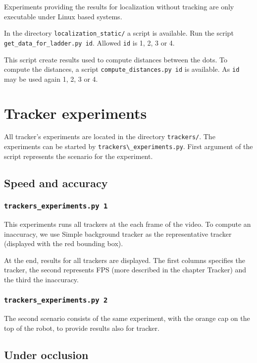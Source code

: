 Experiments providing the results for localization without tracking are only
executable under Linux based systems.

In the directory \verb+localization_static/+ a script is  available.
Run the script \verb+get_data_for_ladder.py id+. Allowed \verb+id+ is 1, 2, 3 or 4.

This script create results used to compute distances between the dots. To
compute the distances, a script \verb+compute_distances.py id+ is available. As
\verb+id+ may be used again 1, 2, 3 or 4. 

\section{Tracker experiments}

All tracker's experiments are located in the directory \verb+trackers/+. The
experiments can be started by \verb+trackers\_experiments.py+. First argument
of the script represents the scenario for the experiment.

\subsection*{Speed and accuracy}

\subsubsection*{\texttt{trackers{\_}experiments.py 1}}

This experiments runs all trackers at the each frame of the video. To compute
an inaccuracy, we use Simple background tracker as the representative tracker
(displayed with the red bounding box).

At the end, results for all trackers are displayed. The first columns specifies
the tracker, the second represents FPS (more described in the chapter Tracker)
and the third the inaccuracy.

\subsubsection*{\texttt{trackers{\_}experiments.py 2}}

The second scenario consists of the same experiment, with the orange cap on the
top of the robot, to provide results also for \hsv{} tracker.

\subsection*{Under occlusion}

